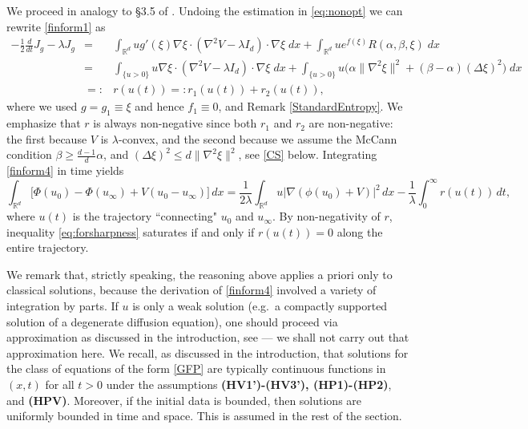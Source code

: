 \documentclass[reqno]{amsart}
\newcommand{\R}{\mathbb{R}}
\newcommand{\Rd}{{\R^d}}
\newcommand{\intRd}{{\int_\Rd}}
\begin{document}
We proceed in analogy to \S3.5 of \cite{AMTU}. Undoing the estimation in \eqref{eq:nonopt} we can rewrite \eqref{finform1} as 
\begin{eqnarray}\label{finform4}
  -\frac12\frac{d}{dt}J_g - \lambda J_g  
  &=&\int_{\R^d} ug'(\xi)\nabla\xi\cdot(\nabla^2 V-\lambda I_d) \cdot \nabla\xi \;dx
  + \int_{\R^d} u e^{f(\xi)} R(\alpha,\beta,\xi) \;dx \\
  &=&\int_{\{u>0\}} u\nabla\xi\cdot(\nabla^2 V-\lambda I_d) \cdot \nabla\xi \;dx
  + \int_{\{u>0\}} u \big(\alpha\|\nabla^2\xi\|^2 +(\beta-\alpha)(\Delta\xi)^2\big) \;dx \nonumber\\
  &=:& r(u(t)) =: r_1(u(t))+r_2(u(t)), \nonumber
\end{eqnarray}
where we used $g=g_1\equiv\xi$ and hence $f_1\equiv0$, and Remark \ref{StandardEntropy}. We emphasize that $r$ is always non-negative since both $r_1$ and $r_2$ are non-negative: the first because $V$ is $\lambda$-convex, and the second because we assume the McCann condition $\beta\ge\frac{d-1}d\alpha$, and $(\Delta\xi)^2\le d\|\nabla^2\xi\|^2$, see \eqref{CS} below.
Integrating \eqref{finform4} in time yields
\begin{equation}\label{error-int}
    \intRd \big[\Phi(u_0)-\Phi(u_\infty) + V(u_0-u_\infty)\big]\,dx
    = \frac1{2\lambda} \intRd u\big|\nabla(\phi(u_0)+V)\big|^2\,dx
  -\frac1{\lambda}\int_0^\infty r(u(t))\,dt,
\end{equation}
where $u(t)$ is the trajectory ``connecting" $u_0$ and $u_\infty$. By non-negativity of $r$, inequality \eqref{eq:forsharpness} saturates if and only if $r(u(t))=0$ along the entire trajectory.

We remark that, strictly speaking, the reasoning above applies a priori only to classical solutions, because the derivation of \eqref{finform4} involved a variety of integration by parts. If $u$ is only a weak solution (e.g.\ a compactly supported solution of a degenerate diffusion equation), one should proceed via approximation as discussed in the introduction, see \cite{otto,CJMTU} --- we shall not carry out that approximation here. We recall, as discussed in the introduction, that solutions for the class of equations of the form \eqref{GFP} are typically continuous functions in $(x,t)$ for all $t>0$ under the assumptions {\bf (HV1')-(HV3'), (HP1)-(HP2)}, and {\bf (HPV)}. Moreover, if the initial data is bounded, then solutions are uniformly bounded in time and space. This is assumed in the rest of the section.
\end{document}
